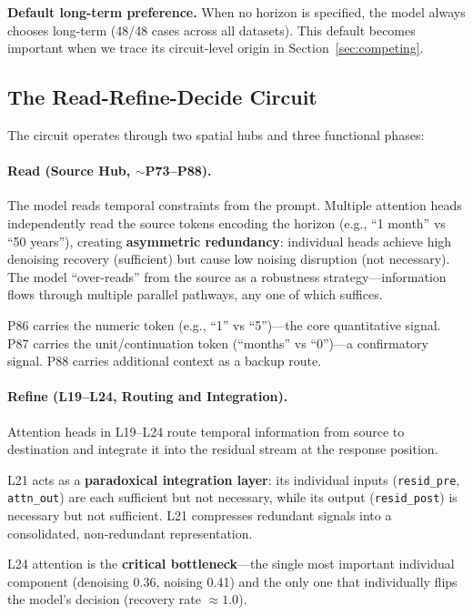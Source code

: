 \documentclass{article}
\begin{document}
\textbf{Default long-term preference.} When no horizon is specified, the model always chooses long-term (48/48 cases across all datasets). This default becomes important when we trace its circuit-level origin in Section~\ref{sec:competing}.

\subsection{The Read-Refine-Decide Circuit}

The circuit operates through two spatial hubs and three functional phases:

\paragraph{Read (Source Hub, $\sim$P73--P88).} The model reads temporal constraints from the prompt. Multiple attention heads independently read the source tokens encoding the horizon (e.g., ``1 month'' vs ``50 years''), creating \textbf{asymmetric redundancy}: individual heads achieve high denoising recovery (sufficient) but cause low noising disruption (not necessary). The model ``over-reads'' from the source as a robustness strategy---information flows through multiple parallel pathways, any one of which suffices.

P86 carries the numeric token (e.g., ``1'' vs ``5'')---the core quantitative signal. P87 carries the unit/continuation token (``months'' vs ``0'')---a confirmatory signal. P88 carries additional context as a backup route.

\paragraph{Refine (L19--L24, Routing and Integration).} Attention heads in L19--L24 route temporal information from source to destination and integrate it into the residual stream at the response position.

L21 acts as a \textbf{paradoxical integration layer}: its individual inputs (\texttt{resid\_pre}, \texttt{attn\_out}) are each sufficient but not necessary, while its output (\texttt{resid\_post}) is necessary but not sufficient. L21 compresses redundant signals into a consolidated, non-redundant representation.

L24 attention is the \textbf{critical bottleneck}---the single most important individual component (denoising 0.36, noising 0.41) and the only one that individually flips the model's decision (recovery rate $\approx 1.0$).
\end{document}
